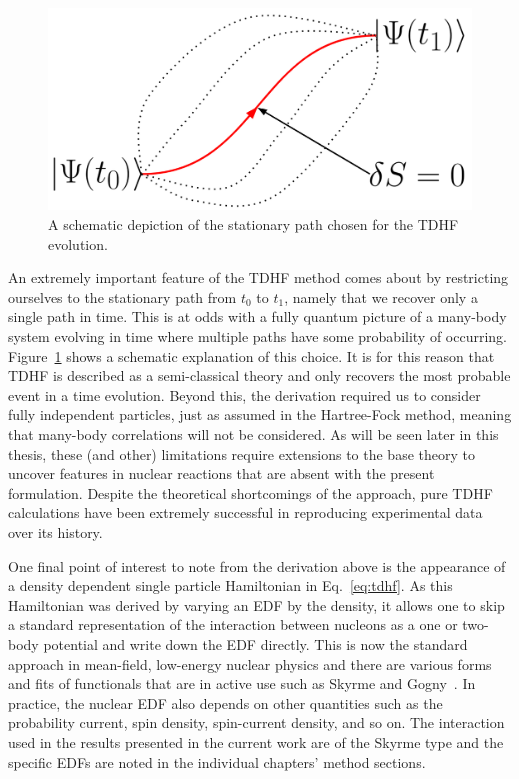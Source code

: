 \begin{figure}[t]
	\includegraphics[width=\textwidth]{../Figures/intro_figs/paths.png}
	\caption{A schematic depiction of the stationary path chosen for the TDHF evolution.\hfill\null}
	\label{fig:paths}
\end{figure}

An extremely important feature of the TDHF method comes about by restricting ourselves to the stationary path from $t_0$ to $t_1$, namely that we recover only a single path in time.
This is at odds with a fully quantum picture of a many-body system evolving in time where multiple paths have some probability of occurring.
Figure~\ref{fig:paths} shows a schematic explanation of this choice.
It is for this reason that TDHF is described as a semi-classical theory and only recovers the most probable event in a time evolution.
Beyond this, the derivation required us to consider fully independent particles, just as assumed in the Hartree-Fock method, meaning that many-body correlations will not be considered.
As will be seen later in this thesis, these (and other) limitations require extensions to the base theory to uncover features in nuclear reactions that are absent with the present formulation.
Despite the theoretical shortcomings of the approach, pure TDHF calculations have been extremely successful in reproducing experimental data over its history.

One final point of interest to note from the derivation above is the appearance of a density dependent single particle Hamiltonian in Eq.~\ref{eq:tdhf}.
As this Hamiltonian was derived by varying an EDF by the density, it allows one to skip a standard representation of the interaction between nucleons as a one or two-body potential and write down the EDF directly.
This is now the standard approach in mean-field, low-energy nuclear physics and there are various forms and fits of functionals that are in active use such as Skyrme and Gogny~\citep{skyrme1956,decharge1980}.
In practice, the nuclear EDF also depends on other quantities such as the probability current, spin density, spin-current density, and so on.
The interaction used in the results presented in the current work are of the Skyrme type and the specific EDFs are noted in the individual chapters' method sections.

